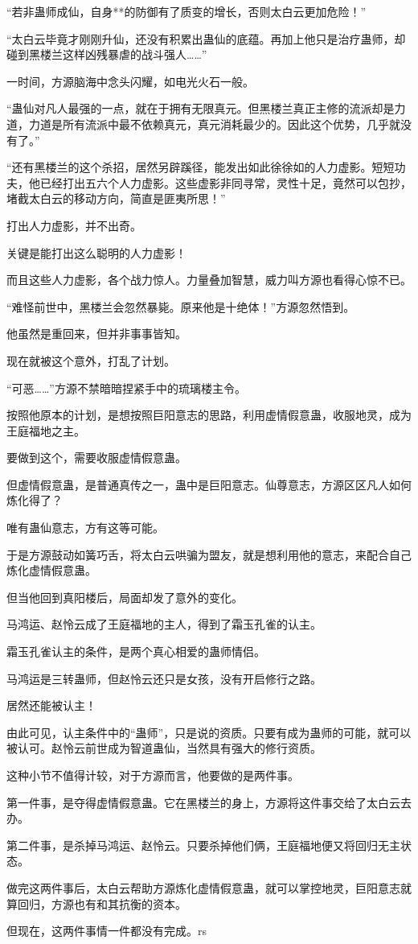 \begin{this_body}
“若非蛊师成仙，自身**的防御有了质变的增长，否则太白云更加危险！”

“太白云毕竟才刚刚升仙，还没有积累出蛊仙的底蕴。再加上他只是治疗蛊师，却碰到黑楼兰这样凶残暴虐的战斗强人……”

一时间，方源脑海中念头闪耀，如电光火石一般。

“蛊仙对凡人最强的一点，就在于拥有无限真元。但黑楼兰真正主修的流派却是力道，力道是所有流派中最不依赖真元，真元消耗最少的。因此这个优势，几乎就没有了。”

“还有黑楼兰的这个杀招，居然另辟蹊径，能发出如此徐徐如的人力虚影。短短功夫，他已经打出五六个人力虚影。这些虚影非同寻常，灵性十足，竟然可以包抄，堵截太白云的移动方向，简直是匪夷所思！”

打出人力虚影，并不出奇。

关键是能打出这么聪明的人力虚影！

而且这些人力虚影，各个战力惊人。力量叠加智慧，威力叫方源也看得心惊不已。

“难怪前世中，黑楼兰会忽然暴毙。原来他是十绝体！”方源忽然悟到。

他虽然是重回来，但并非事事皆知。

现在就被这个意外，打乱了计划。

“可恶……”方源不禁暗暗捏紧手中的琉璃楼主令。

按照他原本的计划，是想按照巨阳意志的思路，利用虚情假意蛊，收服地灵，成为王庭福地之主。

要做到这个，需要收服虚情假意蛊。

但虚情假意蛊，是普通真传之一，蛊中是巨阳意志。仙尊意志，方源区区凡人如何炼化得了？

唯有蛊仙意志，方有这等可能。

于是方源鼓动如簧巧舌，将太白云哄骗为盟友，就是想利用他的意志，来配合自己炼化虚情假意蛊。

但当他回到真阳楼后，局面却发了意外的变化。

马鸿运、赵怜云成了王庭福地的主人，得到了霜玉孔雀的认主。

霜玉孔雀认主的条件，是两个真心相爱的蛊师情侣。

马鸿运是三转蛊师，但赵怜云还只是女孩，没有开启修行之路。

居然还能被认主！

由此可见，认主条件中的“蛊师”，只是说的资质。只要有成为蛊师的可能，就可以被认可。赵怜云前世成为智道蛊仙，当然具有强大的修行资质。

这种小节不值得计较，对于方源而言，他要做的是两件事。

第一件事，是夺得虚情假意蛊。它在黑楼兰的身上，方源将这件事交给了太白云去办。

第二件事，是杀掉马鸿运、赵怜云。只要杀掉他们俩，王庭福地便又将回归无主状态。

做完这两件事后，太白云帮助方源炼化虚情假意蛊，就可以掌控地灵，巨阳意志就算回归，方源也有和其抗衡的资本。

但现在，这两件事情一件都没有完成。rs

\end{this_body}

